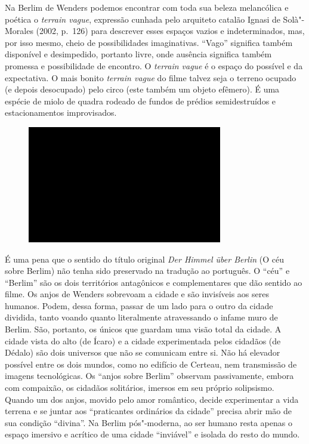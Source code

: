Na Berlim de Wenders podemos encontrar com toda sua beleza melancólica e
poética o \emph{terrain vague}, expressão cunhada pelo arquiteto catalão \label{vague}
Ignasi de Solà"-Morales (2002, p.~126) para descrever esses
espaços vazios e indeterminados, mas, por isso mesmo, cheio de
possibilidades imaginativas. ``Vago'' significa também disponível e
desimpedido, portanto livre, onde ausência significa também promessa e
possibilidade de encontro. O \emph{terrain vague} é o espaço do
possível e da expectativa. O mais bonito \emph{terrain vague} do filme
talvez seja o terreno ocupado (e depois desocupado) pelo circo (este
também um objeto efêmero). É uma espécie de miolo de quadra rodeado de
fundos de prédios semidestruídos e estacionamentos improvisados.

\begin{figure}[!ht]

\centering
 \includegraphics[width=85mm]{./imgs/im1.jpg}
\caption{\tiny{}}

\end{figure}

É uma pena que o sentido do título original \emph{Der Himmel über
Berlin} (O céu sobre Berlim) não tenha sido preservado na tradução ao
português. O ``céu'' e ``Berlim'' são os dois territórios antagônicos e
complementares que dão sentido ao filme. Os anjos de Wenders sobrevoam a
cidade e são invisíveis aos seres humanos. Podem, dessa forma, passar de
um lado para o outro da cidade dividida, tanto voando quanto
literalmente atravessando o infame muro de Berlim. São, portanto, os
únicos que guardam uma visão total da cidade. A cidade vista do alto (de
Ícaro) e a cidade experimentada pelos cidadãos (de Dédalo) são dois
universos que não se comunicam entre si. Não há elevador possível entre
os dois mundos, como no edifício de Certeau, nem transmissão de imagens
tecnológicas. Os ``anjos sobre Berlim'' observam passivamente, embora
com compaixão, os cidadãos solitários, imersos em seu próprio
solipsismo. Quando um dos anjos, movido pelo amor romântico, decide
experimentar a vida terrena e se juntar aos ``praticantes ordinários da
cidade'' precisa abrir mão de sua condição ``divina''. Na Berlim
pós"-moderna, ao ser humano resta apenas o espaço imersivo e acrítico de
uma cidade ``inviável'' e isolada do resto do mundo.

